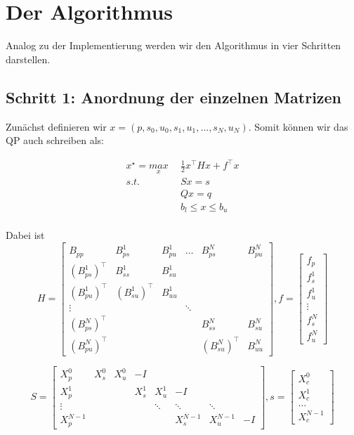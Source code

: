 \section{Der Algorithmus}

Analog zu der Implementierung werden wir den Algorithmus in vier Schritten darstellen.

\subsection*{Schritt 1: Anordnung der einzelnen Matrizen}

Zunächst definieren wir $x=(p,s_0,u_0,s_1,u_1,\hdots,s_{N},u_{N})$. Somit können wir das QP auch schreiben als:

\begin{align*}
x^\star=\underset{x}{max} \ \ 	& \frac{1}{2}	x^\top H x+f^\top x \\
s.t. \ \ 				& Sx=s \\
						& Qx=q \\
						& b_l \leq x \leq b_u \\ 
\end{align*}

Dabei ist $$H= \left[ \begin{array}{cccccc}
B_{pp} & B_{ps}^1 & B_{pu}^1 & \hdots & B_{ps}^{N} & B_{pu}^{N} \\ 
(B_{ps}^1)^\top & B_{ss}^1 & B_{su}^1 &  &  & \\ 
(B_{pu}^1)^\top & (B_{su}^1)^\top & B_{uu}^1 &  &  &  \\ 
\vdots &  &  & \ddots &  &  \\ 
(B_{ps}^{N})^\top &  &  &  & B_{ss}^{N} & B_{su}^{N} \\ 
(B_{pu}^{N})^\top &  &  &  & (B_{su}^{N})^\top & B_{uu}^{N}
\end{array} \right]  
,f=\left[ \begin{array}{c}
f_p \\ 
f_s^1 \\ 
f_u^1 \\ 
\vdots \\ 
f_s^{N} \\ 
f_u^{N}
\end{array}  \right]$$

$$S=\left[\begin{array}{cccccccc}
X_p^0 & X_s^0 & X_u^0 & - I &  &  &  &  \\ 
X_p^1 &  &  & X_s^1 & X_u ^1  & -I &  &  \\ 
\vdots &  &  &  & \ddots & \ddots & \ddots &  \\ 
X_p^{N-1} &  &  &  &  & X_s^{N-1} & X_u^{N-1} & -I
\end{array}  \right],
s=\left[ \begin{array}{c}
X_c^ 0 \\ 
X_c^1 \\ 
\hdots \\ 
X_c^{N-1}
\end{array} \right] $$

